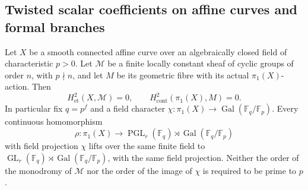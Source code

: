 \subsection{Twisted scalar coefficients on affine curves and formal branches}

\begin{lemma}
\label{D:affine-curve-field-twisted-H2}
Let \(X\) be a smooth connected affine curve over an
algebraically closed field of characteristic \(p>0\).
Let \(\mathcal M\) be a finite locally constant sheaf
of cyclic groups of order \(n\), with \(p\nmid n\),
and let \(M\) be its geometric fibre with its actual
\(\pi_1(X)\)-action. Then
\[
 H^2_{\mathrm{et}}(X,\mathcal M)=0,\qquad
 H^2_{\mathrm{cont}}(\pi_1(X),M)=0.                 \tag{D.CS.1}
\]
In particular fix \(q=p^f\) and a field character
\(\chi:\pi_1(X)\to\operatorname{Gal}(\mathbb F_q/\mathbb F_p)\).
Every continuous homomorphism
\[
 \rho:\pi_1(X)\longrightarrow
 \operatorname{PGL}_r(\mathbb F_q)\rtimes
                 \operatorname{Gal}(\mathbb F_q/\mathbb F_p)
                                                        \tag{D.CS.2}
\]
with field projection \(\chi\) lifts over the same
finite field to \(\operatorname{GL}_r(\mathbb F_q)
\rtimes\operatorname{Gal}(\mathbb F_q/\mathbb F_p)\),
with the same field projection. Neither the order of
the monodromy of \(\mathcal M\) nor the order of the
image of \(\chi\) is required to be prime to \(p\).
\end{lemma}


